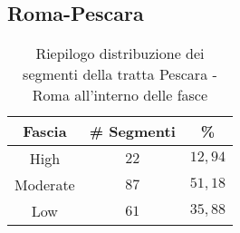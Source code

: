 \subsection{Roma-Pescara}
\label{app:pescararoma}
\begin{table}[hpt]
\centering
\begin{tabular}{|c|c|c|}
\hline \rowcolor{lightgray}
Fascia   & \# Segmenti & \%    \\ \hline \rowcolor{flamingopink}
High     & $22$           & $12,94$     \\ \hline \rowcolor{icterine}
Moderate & $87$          & $51,18$ \\ \hline \rowcolor{inchworm}
Low      & $61$          & $35,88$ \\ \hline
\end{tabular}
\caption{Riepilogo distribuzione dei segmenti della tratta Pescara - Roma all’interno delle fasce}
\end{table} 

